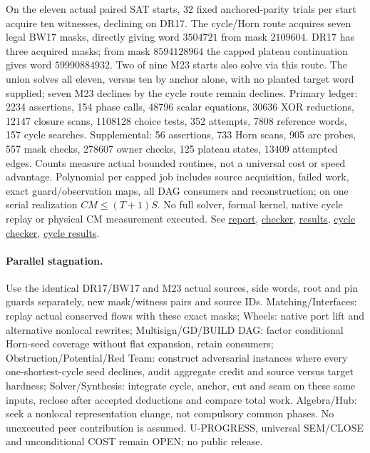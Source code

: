\documentclass[11pt]{article}
\begin{document}
On the eleven actual paired SAT starts, 32 fixed anchored-parity trials per start acquire ten witnesses, declining on DR17. The cycle/Horn route acquires seven legal BW17 masks, directly giving word $3504721$ from mask $2109604$. DR17 has three acquired masks; from mask $8594128964$ the capped plateau continuation gives word $59990884932$. Two of nine M23 starts also solve via this route. The union solves all eleven, versus ten by anchor alone, with no planted target word supplied; seven M23 declines by the cycle route remain declines. Primary ledger: 2234 assertions, 154 phase calls, 48796 scalar equations, 30636 XOR reductions, 12147 closure scans, 1108128 choice tests, 352 attempts, 7808 reference words, 157 cycle searches. Supplemental: 56 assertions, 733 Horn scans, 905 arc probes, 557 mask checks, 278607 owner checks, 125 plateau states, 13409 attempted edges. Counts measure actual bounded routines, not a universal cost or speed advantage. Polynomial per capped job includes source acquisition, failed work, exact guard/observation maps, all DAG consumers and reconstruction; on one serial realization $CM\le(T+1)S$. No full solver, formal kernel, native cycle replay or physical CM measurement executed. See \href{https://github.com/j15marti/pnp/commit/b66e9038472d94182c1f4999a84095b283e8a334}{report}, \href{https://github.com/j15marti/pnp/commit/78f396dcde502461c92208d4ec9876389a7c84a5}{checker}, \href{https://github.com/j15marti/pnp/commit/a0780481a466b2ce5049a5f656cb402ad0c3974b}{results}, \href{https://github.com/j15marti/pnp/commit/1cddbb91d1a74f3308cbb5ece7039dac9e619eee}{cycle checker}, \href{https://github.com/j15marti/pnp/commit/0509ae59be6c5a0cd3dcac2160991ad3f8e8513b}{cycle results}.

\paragraph{Parallel stagnation.}
Use the identical DR17/BW17 and M23 actual sources, side words, root and pin guards separately, new mask/witness pairs and source IDs. Matching/Interfaces: replay actual conserved flows with these exact masks; Wheels: native port lift and alternative nonlocal rewrites; Multisign/GD/BUILD DAG: factor conditional Horn-seed coverage without flat expansion, retain consumers; Obstruction/Potential/Red Team: construct adversarial instances where every one-shortest-cycle seed declines, audit aggregate credit and source versus target hardness; Solver/Synthesis: integrate cycle, anchor, cut and seam on these same inputs, reclose after accepted deductions and compare total work. Algebra/Hub: seek a nonlocal representation change, not compulsory common phases. No unexecuted peer contribution is assumed. U-PROGRESS, universal SEM/CLOSE and unconditional COST remain OPEN; no public release.
\end{document}
